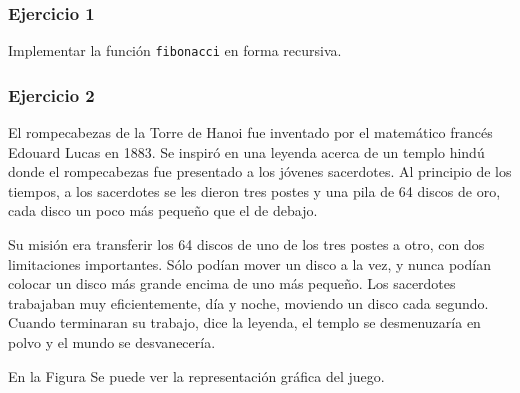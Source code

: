\subsubsection{Ejercicio 1} 
Implementar la función \texttt{fibonacci} en forma recursiva.

\lstset{inputencoding=utf8/latin1}


\subsubsection{Ejercicio 2} 
El rompecabezas de la Torre de Hanoi fue inventado por el matemático francés Edouard Lucas en 1883. Se inspiró en una leyenda acerca de un templo hindú donde el rompecabezas fue presentado a los jóvenes sacerdotes. Al principio de los tiempos, a los sacerdotes se les dieron tres postes y una pila de 64 discos de oro, cada disco un poco más pequeño que el de debajo. 

Su misión era transferir los 64 discos de uno de los tres postes a otro, con dos limitaciones importantes. Sólo podían mover un disco a la vez, y nunca podían colocar un disco más grande encima de uno más pequeño. Los sacerdotes trabajaban muy eficientemente, día y noche, moviendo un disco cada segundo. Cuando terminaran su trabajo, dice la leyenda, el templo se desmenuzaría en polvo y el mundo se desvanecería.

En la Figura  Se puede ver la representación gráfica del juego.

